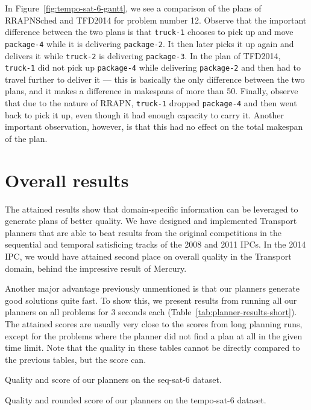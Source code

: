 {In Figure~\ref{fig:tempo-sat-6-gantt}, we see a comparison of the plans
of RRAPNSched and TFD2014 for problem number 12.
Observe that the important difference between the two plans
is that \texttt{truck-1} chooses to pick up and move \texttt{package-4}
while it is delivering \texttt{package-2}. It then later picks it up again and delivers
it while \texttt{truck-2} is delivering \texttt{package-3}.
In the plan of TFD2014, \texttt{truck-1} did not pick up \texttt{package-4}
while delivering \texttt{package-2} and then had to travel further to deliver it
--- this is basically the only difference between the two plans,
and it makes a difference in makespans of more than 50.
Finally, observe that due to the nature of RRAPN, \texttt{truck-1}
dropped \texttt{package-4} and then went back to pick it up, even though it had enough capacity
to carry it. Another important observation, however, is that this had no effect on the total makespan
of the plan.

\section{Overall results}

The attained results show that domain-specific information can be leveraged
to generate plans of better quality.
We have designed and implemented Transport planners that are able to beat
results from the original competitions in the sequential
and temporal satisficing tracks of the 2008 and 2011 IPCs.
In the 2014 IPC, we would have attained second place on overall quality in the Transport domain, behind the impressive result of Mercury.

Another major advantage previously unmentioned is that
our planners generate good solutions quite fast.
To show this, we present results from running all our planners on all problems for 3 seconds each (Table~\ref{tab:planner-results-short}).
The attained scores are usually very close to the
scores from long planning runs, except for the problems
where the planner did not find a plan at all in the
given time limit.
Note that the quality in these tables cannot be directly
compared to the previous tables, but the score can.



\begin{table}[tbp]
\centering
\begin{subtable}{0.48\textwidth}
\centering
\scriptsize
\renewcommand{\footnotesize}{\scriptsize}
\setlength{\tabcolsep}{3.5pt}

\caption{Quality and score of our planners on the seq-sat-6 dataset.}
\label{tab:seq-sat-6-ipc-scores-short}
\end{subtable}
\quad
\begin{subtable}{0.48\textwidth}
\centering
\scriptsize
\renewcommand{\footnotesize}{\scriptsize}
\setlength{\tabcolsep}{2pt}

\caption{Quality and rounded score of our planners on the tempo-sat-6 dataset.}
\label{tab:tempo-sat-6-ipc-scores-short}
\end{subtable}


\end{table}}
